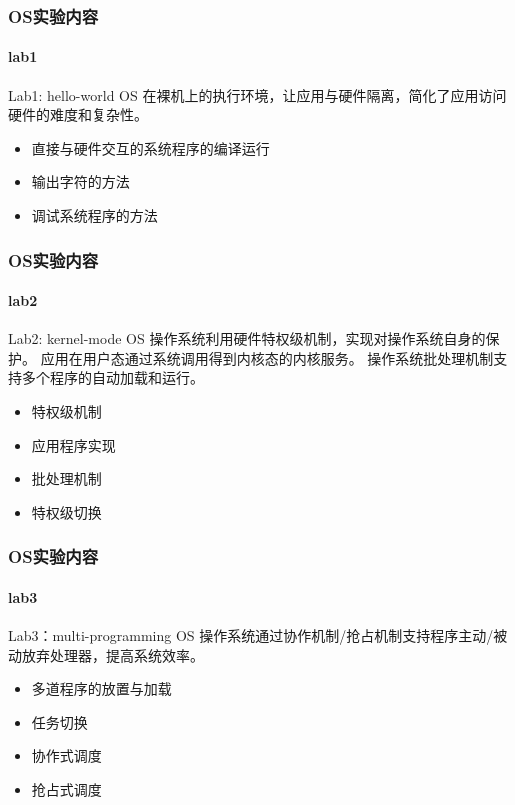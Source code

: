 \begin{frame}
\frametitle{OS实验内容}
\framesubtitle{lab1}
\begin{block}{Lab1:  hello-world OS}
在裸机上的执行环境，让应用与硬件隔离，简化了应用访问硬件的难度和复杂性。
\end{block}

\begin{itemize}
    \item 直接与硬件交互的系统程序的编译运行
    \item 输出字符的方法
    \item 调试系统程序的方法
\end{itemize}
    
\end{frame}


\begin{frame}
\frametitle{OS实验内容}
\framesubtitle{lab2}

\begin{block}{Lab2:  kernel-mode OS}
操作系统利用硬件特权级机制，实现对操作系统自身的保护。
应用在用户态通过系统调用得到内核态的内核服务。
操作系统批处理机制支持多个程序的自动加载和运行。
\end{block}

\begin{itemize}
    \item 特权级机制
    \item 应用程序实现
    \item 批处理机制
    \item 特权级切换
\end{itemize}

\end{frame}

\begin{frame}
\frametitle{OS实验内容}
\framesubtitle{lab3}

\begin{block}{Lab3：multi-programming OS}
操作系统通过协作机制/抢占机制支持程序主动/被动放弃处理器，提高系统效率。
\end{block}

\begin{itemize}
    \item 多道程序的放置与加载
    \item 任务切换
    \item 协作式调度
    \item 抢占式调度    
\end{itemize}

\end{frame}

